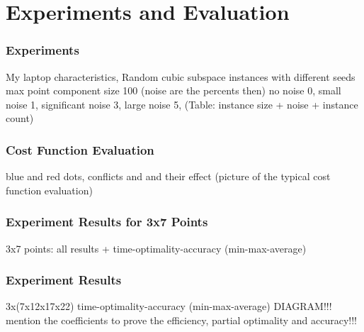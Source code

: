 \section{Experiments and Evaluation}
\frame{\tableofcontents[currentsection]}


\begin{frame}
    \frametitle{Experiments}
    My laptop characteristics, 
    Random cubic subspace instances with different seeds 
    max point component size 100 (noise are the percents then)
    no noise 0,
    small noise 1,
    significant noise 3,
    large noise 5,
    (Table: instance size + noise + instance count)
\end{frame}


\begin{frame}
    \frametitle{Cost Function Evaluation}
    blue and red dots,
    conflicts and and their effect
    (picture of the typical cost function evaluation)
\end{frame}

\begin{frame}
    \frametitle{Experiment Results for 3x7 Points}
    3x7 points: all results +
    time-optimality-accuracy (min-max-average) 
\end{frame}

\begin{frame}
    \frametitle{Experiment Results}
    3x(7x12x17x22) time-optimality-accuracy (min-max-average) 
    DIAGRAM!!! 
    mention the coefficients to prove the efficiency, partial optimality and accuracy!!!
\end{frame}


